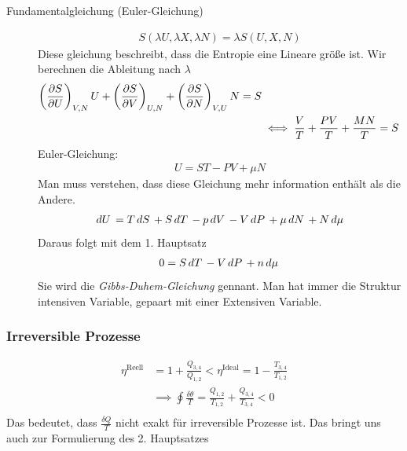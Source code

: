 \begin{description}
  \item[Fundamentalgleichung (Euler-Gleichung)] 
    \begin{align*}
      S(\lambda U, \lambda X, \lambda N) = \lambda S (U, X, N)
    \end{align*}
    Diese gleichung beschreibt, dass die Entropie eine Lineare größe ist.
    Wir berechnen die Ableitung nach $\lambda$
    \begin{align*}
      \left( \frac{\partial S }{\partial U} \right)_{V, N} U + \left( \frac{\partial S }{\partial V} \right)_{U,N}
      + \left( \frac{\partial S }{\partial N} \right)_{V,U} N = S \\
      & \iff 
      \frac{V}{T} +\frac{PV}{T} +\frac{MN}{T} = S
    \end{align*}
    Euler-Gleichung:
    \begin{align*}
      U = ST - PV + \mu N
    \end{align*}
    Man muss verstehen, dass diese Gleichung mehr information enthält als
    die Andere.
    \begin{align*}
      \,dU\, = T \,dS\, + S \,dT\, - p \,dV\, - V \,dP\, + \mu \,dN\, + N \,d\mu\,
    \end{align*}
    Daraus folgt mit dem 1. Hauptsatz
    \begin{align*}
      0 = S \,dT\, - V \,dP\, + n \,d\mu\,
    \end{align*}
    Sie wird die \emph{Gibbs-Duhem-Gleichung} gennant.
    Man hat immer die Struktur intensiven Variable, gepaart mit einer Extensiven
    Variable.
\end{description}
\subsubsection*{Irreversible Prozesse}
%
\begin{align*}
  \eta^{\text{Reell}} &= 1 +\frac{Q_{3,4}}{Q_{1,2}} < \eta^{\text{Ideal}} = 1-\frac{T_{3,4}}{T_{1,2}} \\
         & \implies \oint 
\frac{\delta \theta}{T} =\frac{Q_{1,2}}{T_{1,2}} +\frac{Q_{3,4}}{T_{3,4}} < 0  \\
\end{align*}
%
Das bedeutet, dass $\frac{\delta Q}{T}$ nicht exakt für irreversible Prozesse ist.
Das bringt uns auch zur Formulierung des 2. Hauptsatzes
